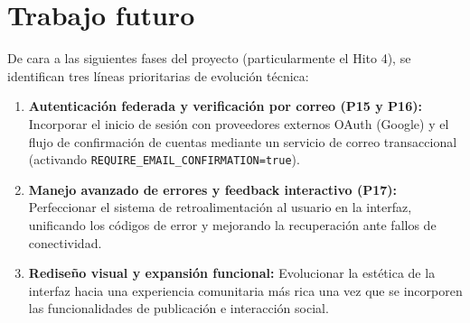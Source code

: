 \section{Trabajo futuro}

De cara a las siguientes fases del proyecto (particularmente el Hito 4), se identifican tres líneas prioritarias de evolución técnica:
\begin{enumerate}
    \item \textbf{Autenticación federada y verificación por correo (P15 y P16):} Incorporar el inicio de sesión con proveedores externos OAuth (Google) y el flujo de confirmación de cuentas mediante un servicio de correo transaccional (activando \texttt{REQUIRE\_EMAIL\_CONFIRMATION=true}).
    \item \textbf{Manejo avanzado de errores y feedback interactivo (P17):} Perfeccionar el sistema de retroalimentación al usuario en la interfaz, unificando los códigos de error y mejorando la recuperación ante fallos de conectividad.
    \item \textbf{Rediseño visual y expansión funcional:} Evolucionar la estética de la interfaz hacia una experiencia comunitaria más rica una vez que se incorporen las funcionalidades de publicación e interacción social.
\end{enumerate}
